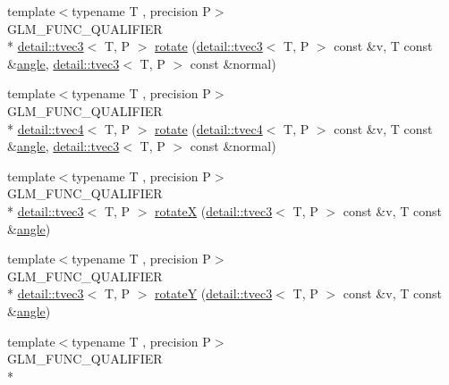 \begin{DoxyCompactItemize}
\item 
{\footnotesize template$<$typename T , precision P$>$ }\\G\-L\-M\-\_\-\-F\-U\-N\-C\-\_\-\-Q\-U\-A\-L\-I\-F\-I\-E\-R \\*
\hyperlink{structglm_1_1detail_1_1tvec3}{detail\-::tvec3}$<$ T, P $>$ \hyperlink{group__gtx__rotate__vector_ga4eccdf3769ce3b5d1e4018394290f88c}{rotate} (\hyperlink{structglm_1_1detail_1_1tvec3}{detail\-::tvec3}$<$ T, P $>$ const \&v, T const \&\hyperlink{group__gtc__quaternion_ga23a3fc7ada5bbb665ff84c92c6e0542c}{angle}, \hyperlink{structglm_1_1detail_1_1tvec3}{detail\-::tvec3}$<$ T, P $>$ const \&normal)
\item 
{\footnotesize template$<$typename T , precision P$>$ }\\G\-L\-M\-\_\-\-F\-U\-N\-C\-\_\-\-Q\-U\-A\-L\-I\-F\-I\-E\-R \\*
\hyperlink{structglm_1_1detail_1_1tvec4}{detail\-::tvec4}$<$ T, P $>$ \hyperlink{group__gtx__rotate__vector_gac4abb6be47bd14303d6eded41f2f65f1}{rotate} (\hyperlink{structglm_1_1detail_1_1tvec4}{detail\-::tvec4}$<$ T, P $>$ const \&v, T const \&\hyperlink{group__gtc__quaternion_ga23a3fc7ada5bbb665ff84c92c6e0542c}{angle}, \hyperlink{structglm_1_1detail_1_1tvec3}{detail\-::tvec3}$<$ T, P $>$ const \&normal)
\item 
{\footnotesize template$<$typename T , precision P$>$ }\\G\-L\-M\-\_\-\-F\-U\-N\-C\-\_\-\-Q\-U\-A\-L\-I\-F\-I\-E\-R \\*
\hyperlink{structglm_1_1detail_1_1tvec3}{detail\-::tvec3}$<$ T, P $>$ \hyperlink{group__gtx__rotate__vector_gadb69cdc8ea08715c9d8a74f587cf0eac}{rotate\-X} (\hyperlink{structglm_1_1detail_1_1tvec3}{detail\-::tvec3}$<$ T, P $>$ const \&v, T const \&\hyperlink{group__gtc__quaternion_ga23a3fc7ada5bbb665ff84c92c6e0542c}{angle})
\item 
{\footnotesize template$<$typename T , precision P$>$ }\\G\-L\-M\-\_\-\-F\-U\-N\-C\-\_\-\-Q\-U\-A\-L\-I\-F\-I\-E\-R \\*
\hyperlink{structglm_1_1detail_1_1tvec3}{detail\-::tvec3}$<$ T, P $>$ \hyperlink{group__gtx__rotate__vector_gae1e673b7a464218ce6a5e8f02145f877}{rotate\-Y} (\hyperlink{structglm_1_1detail_1_1tvec3}{detail\-::tvec3}$<$ T, P $>$ const \&v, T const \&\hyperlink{group__gtc__quaternion_ga23a3fc7ada5bbb665ff84c92c6e0542c}{angle})
\item 
{\footnotesize template$<$typename T , precision P$>$ }\\G\-L\-M\-\_\-\-F\-U\-N\-C\-\_\-\-Q\-U\-A\-L\-I\-F\-I\-E\-R \\*

\end{DoxyCompactItemize}
